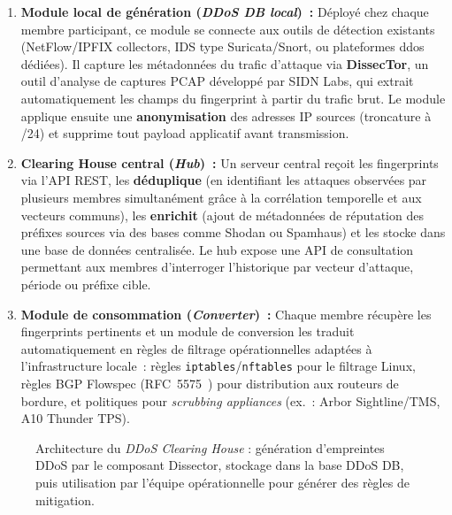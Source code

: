 \begin{enumerate}
    \item \textbf{Module local de génération (\textit{DDoS DB local})~:} Déployé chez chaque membre participant, ce module se connecte aux outils de détection existants (NetFlow/IPFIX collectors, IDS type Suricata/Snort, ou plateformes \gls{ddos} dédiées). Il capture les métadonnées du trafic d'attaque via \textbf{DissecTor}, un outil d'analyse de captures PCAP développé par SIDN Labs, qui extrait automatiquement les champs du fingerprint à partir du trafic brut. Le module applique ensuite une \textbf{anonymisation} des adresses IP sources (troncature à /24) et supprime tout payload applicatif avant transmission.

    \item \textbf{Clearing House central (\textit{Hub})~:} Un serveur central reçoit les fingerprints via l'API REST, les \textbf{déduplique} (en identifiant les attaques observées par plusieurs membres simultanément grâce à la corrélation temporelle et aux vecteurs communs), les \textbf{enrichit} (ajout de métadonnées de réputation des préfixes sources via des bases comme Shodan ou Spamhaus) et les stocke dans une base de données centralisée. Le hub expose une API de consultation permettant aux membres d'interroger l'historique par vecteur d'attaque, période ou préfixe cible.

    \item \textbf{Module de consommation (\textit{Converter})~:} Chaque membre récupère les fingerprints pertinents et un module de conversion les traduit automatiquement en règles de filtrage opérationnelles adaptées à l'infrastructure locale~: règles \texttt{iptables}/\texttt{nftables} pour le filtrage Linux, règles BGP Flowspec (RFC~5575~\parencite{marques2009flowspec}) pour distribution aux routeurs de bordure, et politiques pour \textit{scrubbing appliances} (ex.~: Arbor Sightline/TMS, A10 Thunder TPS).
\end{enumerate}

\begin{figure}[H]
\centering



\caption{Architecture du \textit{DDoS Clearing House} : génération d'empreintes DDoS par le composant Dissector, stockage dans la base DDoS DB, puis utilisation par l'équipe opérationnelle pour générer des règles de mitigation.}

\label{fig:ddos_clearing_house}

\end{figure}

